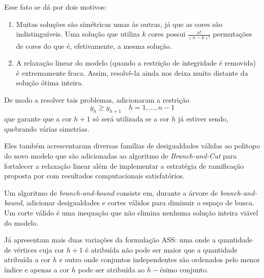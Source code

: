 \documentclass[11pt]{article}
\begin{document}
Esse fato se dá por dois motivos:
\begin{enumerate}
\item Muitas soluções são simétricas umas às outras, já que as cores são indistinguíveis. Uma solução que utiliza \(k\) cores possui \(\frac{n!}{(n-k)!}\) permutações de cores do que é, efetivamente, a mesma solução.
\item A relaxação linear do modelo (quando a restrição de integridade é removida) é extremamente fraca. Assim, resolvê-la ainda nos deixa muito distante da solução ótima inteira.
\end{enumerate}

De modo a resolver tais problemas, \textcite{MendezDiaz2006BranchCutAlgorithm} adicionaram a restrição
\[ y_h \geq y_{h+1} \quad h = 1, \dots, n-1 \]
que garante que a cor \(h+1\) só será utilizada se a cor \(h\) já estiver sendo, quebrando várias simetrias.

Eles também acrescentaram diversas famílias de desigualdades válidas ao politopo do novo modelo que são adicionadas ao algoritmo de \emph{Branch-and-Cut} para fortalecer a relaxação linear além de implementar a estratégia de ramificação proposta por \textcite{Brelaz1979Newmethodscolor} com resultados computacionais satisfatórios.

Um algoritmo de \emph{branch-and-bound} consiste em, durante a árvore de \emph{branch-and-bound}, adicionar desigualdades e cortes válidos para diminuir o espaço de busca. Um corte válido é uma inequação que não elimina nenhuma solução inteira viável do modelo.

Já \textcite{MendezDiaz2008CuttingPlaneAlgorithm} apresentam mais duas variações da formulação ASS: uma onde a quantidade de vértices cuja cor \(h+1\) é atribuída não pode ser maior que a quantidade atribuída a cor \(h\) e outro onde conjuntos independentes são ordenados pelo menor índice e apenas a cor \(h\) pode ser atribuída ao \(h-\text{ésimo}\) conjunto.
\end{document}
